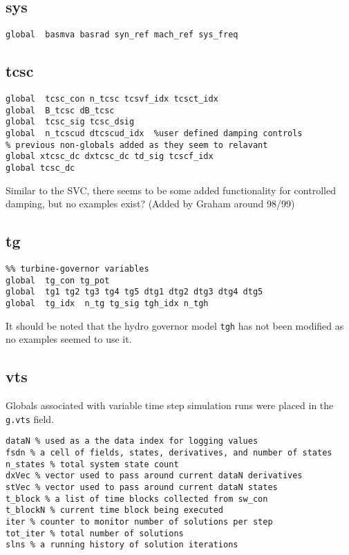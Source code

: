 \subsection{sys}
\begin{verbatim}
global  basmva basrad syn_ref mach_ref sys_freq
\end{verbatim}

\subsection{tcsc}
\begin{verbatim}
global  tcsc_con n_tcsc tcsvf_idx tcsct_idx
global  B_tcsc dB_tcsc
global  tcsc_sig tcsc_dsig
global  n_tcscud dtcscud_idx  %user defined damping controls
% previous non-globals added as they seem to relavant
global xtcsc_dc dxtcsc_dc td_sig tcscf_idx 
global tcsc_dc
\end{verbatim}
Similar to the SVC, there seems to be some added functionality for controlled damping, but no examples exist? (Added by Graham around 98/99)


\subsection{tg}
\begin{verbatim}
%% turbine-governor variables
global  tg_con tg_pot
global  tg1 tg2 tg3 tg4 tg5 dtg1 dtg2 dtg3 dtg4 dtg5
global  tg_idx  n_tg tg_sig tgh_idx n_tgh
\end{verbatim}
It should be noted that the hydro governor model \verb|tgh| has not been modified as no examples seemed to use it.

\subsection{vts}  
Globals associated with variable time step simulation runs were placed in the \verb|g.vts| field.

\begin{verbatim}
dataN % used as a the data index for logging values
fsdn % a cell of fields, states, derivatives, and number of states
n_states % total system state count
dxVec % vector used to pass around current dataN derivatives
stVec % vector used to pass around current dataN states
t_block % a list of time blocks collected from sw_con
t_blockN % current time block being executed
iter % counter to monitor number of solutions per step
tot_iter % total number of solutions
slns % a running history of solution iterations
\end{verbatim}

